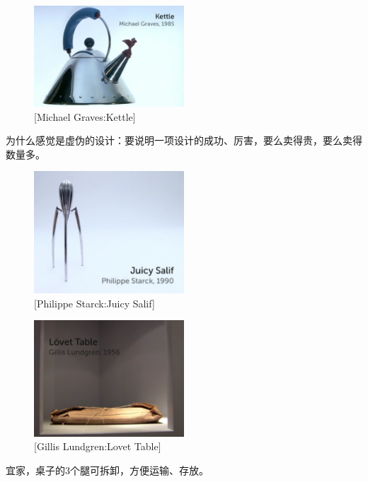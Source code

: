 \documentclass[UTF8]{../RepresentationUniverse}
\begin{document}
\begin{figure}[h]
    \centering
    \includegraphics[width=0.5\textwidth]{./src/figures/Kettle_2023-04-09_21-21-57.png}
    \caption{[Michael Graves:Kettle]}
    \label{figure:Kettle}
\end{figure}

为什么感觉是虚伪的设计：要说明一项设计的成功、厉害，要么卖得贵，要么卖得数量多。



\begin{figure}[h]
    \centering
    \includegraphics[width=0.5\textwidth]{./src/figures/Juicy Salif_2023-04-09_21-25-09.png}
    \caption{[Philippe Starck:Juicy Salif]}
    \label{figure:Juicy Salif}
\end{figure}


\begin{figure}[h]
    \centering
    \includegraphics[width=0.5\textwidth]{./src/figures/Lovet Table_2023-04-09_21-30-09.png}
    \caption{[Gillis Lundgren:Lovet Table]}
    \label{figure:Lovet Table}
\end{figure}
宜家，桌子的3个腿可拆卸，方便运输、存放。
\end{document}
